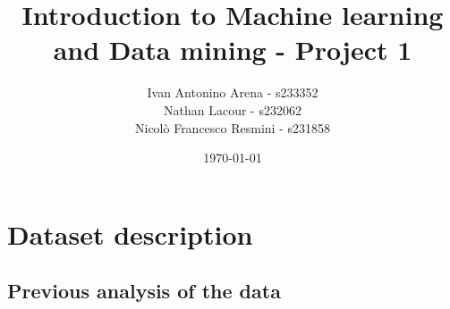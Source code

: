 \documentclass[11pt,a4paper]{article}
\begin{document}
 

\title{Introduction to Machine learning and Data mining - Project 1} %

\author{Ivan Antonino Arena - s233352 \\
 Nathan Lacour - s232062 \\
 Nicolò Francesco Resmini - s231858  }  %
 
\date{\today}

\maketitle

\section{Dataset description}


\subsection*{Previous analysis of the data}
\end{document}
